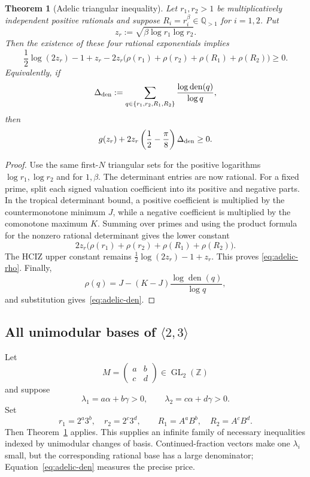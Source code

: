 \documentclass[11pt]{article}
\newtheorem{theorem}{Theorem}[section]
\theoremstyle{definition}
\newcommand{\Z}{\mathbb Z}
\newcommand{\Q}{\mathbb Q}
\newcommand{\den}{\operatorname{den}}
\begin{document}
\begin{theorem}[Adelic triangular inequality]\label{thm:adelic-triangle}
Let $r_1,r_2>1$ be multiplicatively independent positive rationals and suppose
$R_i=r_i^\beta\in\Q_{>1}$ for $i=1,2$.  Put
\[
 z_r:=\sqrt{\beta\log r_1\log r_2}.
\]
Then the existence of these four rational exponentials implies
\begin{equation}\label{eq:adelic-rho}
 \frac12\log(2z_r)-1+z_r
 -2z_r\bigl(\rho(r_1)+\rho(r_2)+\rho(R_1)+\rho(R_2)\bigr)\ge0.
\end{equation}
Equivalently, if
\[
 \Delta_{\rm den}:=
 \sum_{q\in\{r_1,r_2,R_1,R_2\}}
 \frac{\log\den(q)}{\log q},
\]
then
\begin{equation}\label{eq:adelic-den}
 g(z_r)+2z_r\left(\frac12-\frac\pi8\right)\Delta_{\rm den}\ge0.
\end{equation}
\end{theorem}
\begin{proof}
Use the same first-$N$ triangular sets for the positive logarithms
$\log r_1,\log r_2$ and for $1,\beta$.  The determinant entries are now
rational.  For a fixed prime, split each signed valuation coefficient into its
positive and negative parts.  In the tropical determinant bound, a positive
coefficient is multiplied by the countermonotone minimum $J$, while a negative
coefficient is multiplied by the comonotone maximum $K$.  Summing over primes
and using the product formula for the nonzero rational determinant gives the
lower constant
\[
 2z_r\bigl(\rho(r_1)+\rho(r_2)+\rho(R_1)+\rho(R_2)\bigr).
\]
The HCIZ upper constant remains $\tfrac12\log(2z_r)-1+z_r$.  This proves
\eqref{eq:adelic-rho}.  Finally,
\[
 \rho(q)=J-(K-J)\frac{\log\den(q)}{\log q},
\]
and substitution gives~\eqref{eq:adelic-den}.
\end{proof}

\subsection{All unimodular bases of $\langle2,3\rangle$}

Let
\[
 M=\begin{pmatrix}a&b\\c&d\end{pmatrix}\in\operatorname{GL}_2(\Z)
\]
and suppose
\[
 \lambda_1=a\alpha+b\gamma>0,\qquad
 \lambda_2=c\alpha+d\gamma>0.
\]
Set
\[
 r_1=2^a3^b,\quad r_2=2^c3^d,\qquad
 R_1=A^aB^b,\quad R_2=A^cB^d.
\]
Then Theorem~\ref{thm:adelic-triangle} applies.  This supplies an infinite
family of necessary inequalities indexed by unimodular changes of basis.
Continued-fraction vectors make one $\lambda_i$ small, but the corresponding
rational base has a large denominator; Equation~\eqref{eq:adelic-den} measures
the precise price.
\end{document}
